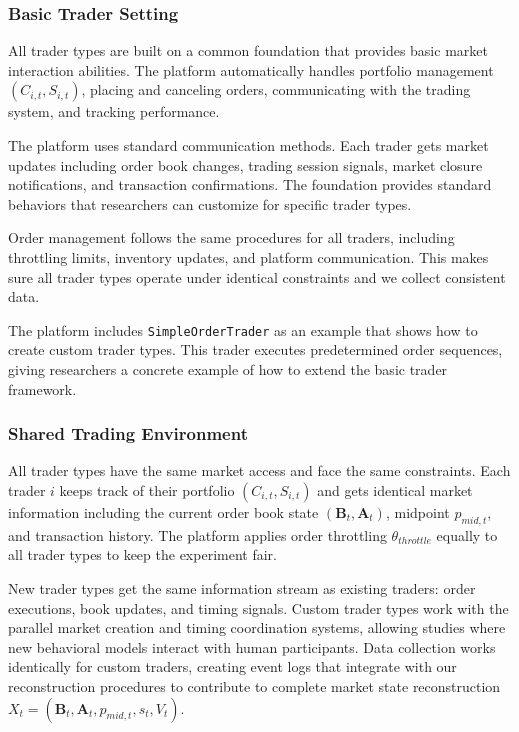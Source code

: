 \subsubsection{Basic Trader Setting}

All trader types are built on a common foundation that provides basic market interaction abilities. The platform automatically handles portfolio management $(C_{i,t}, S_{i,t})$, placing and canceling orders, communicating with the trading system, and tracking performance.

The platform uses standard communication methods. Each trader gets market updates including order book changes, trading session signals, market closure notifications, and transaction confirmations. The foundation provides standard behaviors that researchers can customize for specific trader types.

Order management follows the same procedures for all traders, including throttling limits, inventory updates, and platform communication. This makes sure all trader types operate under identical constraints and we collect consistent data.

The platform includes \texttt{SimpleOrderTrader} as an example that shows how to create custom trader types. This trader executes predetermined order sequences, giving researchers a concrete example of how to extend the basic trader framework.

\subsubsection{Shared Trading Environment}

All trader types have the same market access and face the same constraints. Each trader $i$ keeps track of their portfolio $(C_{i,t}, S_{i,t})$ and gets identical market information including the current order book state $(\mathbf{B}_t, \mathbf{A}_t)$, midpoint $p_{mid,t}$, and transaction history. The platform applies order throttling $\theta_{throttle}$ equally to all trader types to keep the experiment fair.

New trader types get the same information stream as existing traders: order executions, book updates, and timing signals. Custom trader types work with the parallel market creation and timing coordination systems, allowing studies where new behavioral models interact with human participants. Data collection works identically for custom traders, creating event logs that integrate with our reconstruction procedures to contribute to complete market state reconstruction $X_t = (\mathbf{B}_t, \mathbf{A}_t, p_{mid,t}, s_t, V_t)$.

